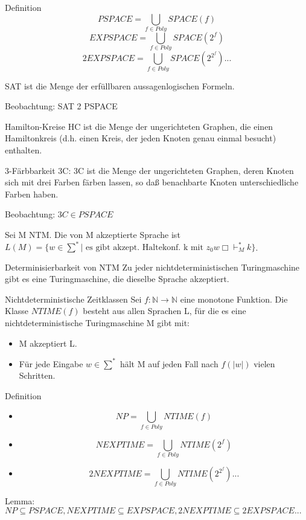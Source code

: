 \documentclass[avery5371]{flashcards}
\begin{document}
\begin{flashcard}[Definition]{Definition}
$$PSPACE = \bigcup_{f\in Poly} SPACE(f)$$
$$EXPSPACE = \bigcup_{f\in Poly} SPACE(2^f)$$
$$2EXPSPACE = \bigcup_{f\in Poly} SPACE(2^{2^{f}})...$$
\end{flashcard}

\begin{flashcard}[Definition]{ SAT }ist die Menge der erfüllbaren aussagenlogischen Formeln.

Beobachtung: SAT 2 PSPACE
\end{flashcard}

\begin{flashcard}[Definition]{Hamilton-Kreise HC } ist die Menge der ungerichteten Graphen, die einen Hamiltonkreis (d.h. einen Kreis, der jeden Knoten genau einmal besucht) enthalten.
\end{flashcard}

\begin{flashcard}[Definition]{3-Färbbarkeit  3C}: 3C ist die Menge der ungerichteten Graphen, deren Knoten sich mit drei Farben färben lassen, so daß benachbarte Knoten unterschiedliche Farben haben.

Beobachtung: $3C \in PSPACE$
\end{flashcard}

\begin{flashcard}[Definition]{Sei M NTM. Die von M akzeptierte Sprache ist }$L(M) = \{w\in\sum^* | \text{ es gibt akzept. Haltekonf. k mit } z_0 w\Box \vdash_M^* k\}$.
\end{flashcard}

\begin{flashcard}[Satz]{Determinisierbarkeit von NTM} Zu jeder nichtdeterministischen Turingmaschine gibt es eine Turingmaschine, die dieselbe Sprache akzeptiert.
\end{flashcard}

\begin{flashcard}[Definition]{ Nichtdeterministische Zeitklassen}
Sei $f:\mathbb{N}\rightarrow\mathbb{N}$ eine monotone Funktion. Die Klasse $NTIME(f)$ besteht aus allen Sprachen L, für die es eine nichtdeterministische Turingmaschine M gibt mit:\begin{itemize}
\item M akzeptiert L.
\item Für jede Eingabe $w\in\sum^*$ hält M auf jeden Fall nach $f(|w|)$ vielen Schritten.
\end{itemize}
Definition\begin{itemize}
\item $$NP = \bigcup_{f\in Poly} NTIME(f)$$
\item $$NEXPTIME = \bigcup_{f\in Poly} NTIME(2^f)$$
\item $$2NEXPTIME = \bigcup_{f\in Poly} NTIME(2^{2^{f}})...$$
\end{itemize}
Lemma: $NP \subseteq PSPACE, NEXPTIME \subseteq EXPSPACE, 2NEXPTIME \subseteq 2EXPSPACE ...$
\end{flashcard}
\end{document}
